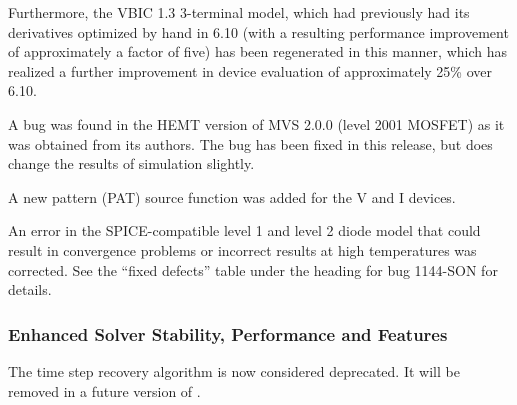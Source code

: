 \documentclass[letterpaper]{scrartcl}
\begin{document}
\begin{XyceItemize}
  Furthermore, the VBIC 1.3 3-terminal model, which had previously had
  its derivatives optimized by hand in \Xyce{} 6.10 (with a resulting
  performance improvement of approximately a factor of five) has been
  regenerated in this manner, which has realized a further improvement
  in device evaluation of approximately 25\% over \Xyce{} 6.10.
\item A bug was found in the HEMT version of MVS 2.0.0 (level 2001
  MOSFET) as it was obtained from its authors.  The bug has been fixed
  in this release, but does change the results of simulation slightly.
\item A new pattern (PAT) source function was added for the V
  and I devices.
\item An error in the SPICE-compatible level 1 and level 2 diode model
  that could result in convergence problems or incorrect results at
  high temperatures was corrected.  See the ``fixed defects'' table
  under the heading for bug 1144-SON for details.
\end{XyceItemize}

\subsubsection*{Enhanced Solver Stability, Performance and Features}
\begin{XyceItemize}
\item The time step recovery algorithm is now considered deprecated.  It will be removed in a future version of \Xyce{}.
\end{XyceItemize}
\end{document}
